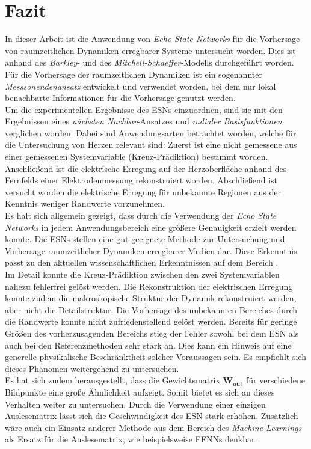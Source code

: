 \chapter{Fazit}
In dieser Arbeit ist die Anwendung von \textit{Echo State Networks} für die Vorhersage von raumzeitlichen Dynamiken erregbarer Systeme untersucht worden. Dies ist anhand des \textit{Barkley}- und des \textit{Mitchell-Schaeffer}-Modells durchgeführt worden. Für die Vorhersage der raumzeitlichen Dynamiken ist ein sogenannter \textit{Messsonendenansatz} entwickelt und verwendet worden, bei dem nur lokal benachbarte Informationen für die Vorhersage genutzt werden.\\

Um die experimentellen Ergebnisse des \textsc{ESN}s einzuordnen, sind sie mit den Ergebnissen eines \textit{nächsten Nachbar}-Ansatzes und \textit{radialer Basisfunktionen} verglichen worden. Dabei sind Anwendungsarten betrachtet worden, welche für die Untersuchung von Herzen relevant sind: Zuerst ist eine nicht gemessene aus einer gemessenen Systemvariable (Kreuz-Prädiktion) bestimmt worden. Anschließend ist die elektrische Erregung auf der Herzoberfläche anhand des Fernfelds einer Elektrodenmessung rekonstruiert worden. Abschließend ist versucht worden die elektrische Erregung für unbekannte Regionen aus der Kenntnis weniger Randwerte vorzunehmen.\\

Es halt sich allgemein gezeigt, dass durch die Verwendung der \textit{Echo State Networks} in jedem Anwendungsbereich eine größere Genauigkeit erzielt werden konnte. Die \textsc{ESN}s stellen eine gut geeignete Methode zur Untersuchung und Vorhersage raumzeitlicher Dynamiken erregbarer Medien dar. Diese Erkenntnis passt zu den aktuellen wissenschaftlichen Erkenntnissen auf dem Bereich \citep{Lu2017}.\\

Im Detail konnte die Kreuz-Prädiktion zwischen den zwei Systemvariablen nahezu fehlerfrei gelöst werden. Die Rekonstruktion der elektrischen Erregung konnte zudem die makroskopische Struktur der Dynamik rekonstruiert werden, aber nicht die Detailstruktur. Die Vorhersage des unbekannten Bereiches durch die Randwerte konnte nicht zufriedenstellend gelöst werden. Bereits für geringe Größen des vorherzusagenden Bereichs stieg der Fehler sowohl bei dem \textsc{ESN} als auch bei den Referenzmethoden sehr stark an. Dies kann ein Hinweis auf eine generelle physikalische Beschränktheit solcher Voraussagen sein. Es empfiehlt sich dieses Phänomen weitergehend zu untersuchen. \\

Es hat sich zudem herausgestellt, dass die Gewichtsmatrix $\mathbf{W_{out}}$ für verschiedene Bildpunkte eine große Ähnlichkeit aufzeigt. Somit bietet es sich an dieses Verhalten weiter zu untersuchen. Durch die Verwendung einer einzigen Auslesematrix lässt sich die Geschwindigkeit des \textsc{ESN} stark erhöhen. Zusätzlich wäre auch ein Einsatz anderer Methode aus dem Bereich des \textit{Machine Learnings} als Ersatz für die Auslesematrix, wie beispielsweise \textsc{FFNN}s denkbar.  